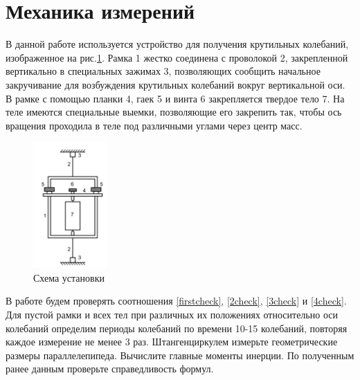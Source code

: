 \section{Механика измерений}
В данной работе используется устройство для получения крутильных колебаний, изображенное на рис.\ref{fig:scheme}. Рамка 1 жестко соединена
с проволокой 2, закрепленной вертикально в специальных зажимах
3, позволяющих сообщить начальное закручивание для возбуждения
крутильных колебаний вокруг вертикальной оси. В рамке с помощью
планки 4, гаек 5 и винта 6 закрепляется твердое тело 7. На теле имеются специальные выемки, позволяющие его закрепить так, чтобы ось
вращения проходила в теле под различными углами через центр масс.
 \begin{figure}[h]
   \centering
   \includegraphics[width = 0.25\textwidth]{images/1.png}
   \caption{Схема установки}
   \label{fig:scheme}
\end{figure}

В работе будем проверять соотношения \eqref{firstcheck}, \eqref{2check}, \eqref{3check} и \eqref{4check}.
Для пустой рамки и всех тел при различных их положениях относительно оси колебаний определим периоды колебаний по времени 10-15
колебаний, повторяя каждое измерение не менее 3 раз. Штангенциркулем измерьте
геометрические размеры параллелепипеда. Вычислите главные моменты инерции. По
полученным ранее данным проверьте справедливость формул.
